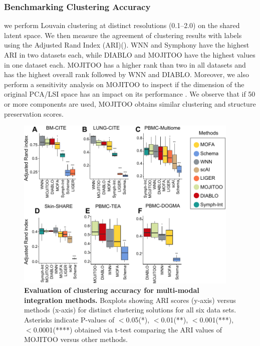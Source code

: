\subsubsection{Benchmarking Clustering Accuracy}
we perform Louvain clustering at distinct resolutions (0.1–2.0) on the shared latent space. We then measure the agreement of clustering results with labels using the Adjusted Rand Index (ARI)(). WNN and Symphony have the highest ARI in two datasets each, while DIABLO and MOJITOO have the highest values in one dataset each. MOJITOO has a higher rank than two in all datasets and has the highest overall rank followed by WNN and DIABLO. Moreover, we also perform a sensitivity analysis on MOJITOO to inspect if the dimension of the original PCA/LSI space has an impact on its performance . We observe that if 50 or more components are used, MOJITOO obtains similar clustering and structure preservation scores. 
\begin{figure}[!ht]
	\centering
	\includegraphics[width=0.95\textwidth]{ari/fig}
	\vspace{0.1cm}
	\caption[Evaluation of clustering accuracy for multi-modal integration methods.]{
	\textbf{Evaluation of clustering accuracy for multi-modal integration methods.} Boxplots showing ARI scores (y-axis) versus methods (x-axis) for distinct clustering solutions for all six data sets. Asterisks indicate P-values of $<$0.05(*), $<$0.01(**), $<$0.001(***), $<$0.0001(****) obtained via t-test comparing the ARI values of MOJITOO versus other methods. }
	\label{fig:ari}
\end{figure}

